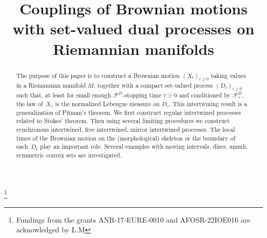 \documentclass[JEP,XML,SOM,Unicode,NoFloatCountersInSection,published]{cedram}
\theoremstyle{plain}
\theoremstyle{definition}
\begin{document}
\title[Couplings of Brownian motions with set-valued dual processes]{Couplings of Brownian motions with set-valued dual processes on Riemannian manifolds}

\author[\initial{M.} \lastname{Arnaudon}]{ }
\address{Univ. Bordeaux, CNRS, Bordeaux INP, Institut de Mathématiques de Bordeaux, UMR 5251,\\
F-33405, Talence, France}

\author[\initial{K.} \middlename{A.} \lastname{Coulibaly-Pasquier}]{ }
\address{Institut Élie Cartan de Lorraine, UMR 7502, Université de Lorraine and CNRS,\\
Boulevard des Aiguillettes, 54506 Vand\oe uvre-lès-Nancy, France}

\author[\initial{L.} \lastname{Miclo}]{\nobreakauthor {}}
\address{Institut de Mathématiques de Toulouse, UMR 5219, \& Toulouse School of Economics, UMR 5314, CNRS and Université de Toulouse,\\
1, Esplanade de l'Université, F-31080 Toulouse Cedex 06, France}

\thanks{Fundings from the grants ANR-17-EURE-0010 and AFOSR-22IOE016 are acknowledged by L.M}

\begin{abstract}
The purpose of this paper is to construct a Brownian motion $(X_t)_{t\geq 0}$ taking values in a Riemannian manifold $M$, together with a compact set-valued process $ (D_t)_{t\geq 0}$ such that, at least for small enough ${\mathscr F}^D$-stopping time $\tau> 0$ and conditioned by ${\mathscr F}_\tau^D$, the law of~$X_\tau$ is the normalized Lebesgue measure on $D_\tau$. This intertwining result is a generalization of Pitman's theorem. We first construct regular intertwined processes related to Stokes' theorem. Then using several limiting procedures we construct synchronous intertwined, free intertwined, mirror intertwined processes. The local times of the Brownian motion on the (morphological) skeleton or the boundary of each~$D_t$ play an important role. Several examples with moving intervals, discs, annuli, symmetric convex sets are investigated.
\end{abstract}
\end{document}
